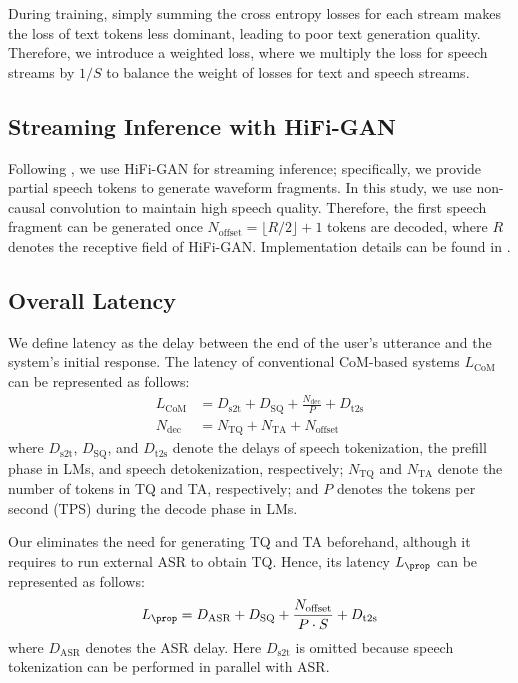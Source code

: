 During training, simply summing the cross entropy losses for each stream makes the loss of text tokens less dominant, leading to poor text generation quality.
Therefore, we introduce a weighted loss, where we multiply the loss for speech streams by $1/S$ to balance the weight of losses for text and speech streams.

\subsection{Streaming Inference with HiFi-GAN}
Following \citet{chen2022streaming}, we use HiFi-GAN for streaming inference; specifically, we provide partial speech tokens to generate waveform fragments.
In this study, we use non-causal convolution to maintain high speech quality.
Therefore, the first speech fragment can be generated once $N_\textrm{offset} = \lfloor R / 2 \rfloor + 1$ tokens are decoded, where $R$ denotes the receptive field of HiFi-GAN.
Implementation details can be found in .

\subsection{Overall Latency}
\label{sec:latency}
We define latency as the delay between the end of the user's utterance and the system's initial response.
The latency of conventional CoM-based systems $L_\textrm{CoM}$ can be represented as follows:
\begin{align}
    L_\textrm{CoM} &= D_\textrm{s2t} + D_\textrm{SQ} + \frac{N_\textrm{dec}}{P} + D_\textrm{t2s} \\
    N_\textrm{dec} &= N_\textrm{TQ} + N_\textrm{TA} + N_\textrm{offset}
    \label{eq:latency_com}
\end{align}
where $D_\textrm{s2t}$, $D_\textrm{SQ}$, and $D_\textrm{t2s}$ denote the delays of speech tokenization, the prefill phase in LMs, and speech detokenization, respectively; $N_\textrm{TQ}$ and $N_\textrm{TA}$ denote the number of tokens in TQ and TA, respectively; and $P$ denotes the tokens per second (TPS) during the decode phase in LMs.

Our \prop eliminates the need for generating TQ and TA beforehand, although it requires to run external ASR to obtain TQ.
Hence, its latency $L_\textrm{\prop}$ can be represented as follows:
\begin{align}
    L_\textrm{\prop} = D_\textrm{ASR} + D_\textrm{SQ} + \frac{N_\textrm{offset}}{P\cdot S} + D_\textrm{t2s}
    \label{eq:latency_pslm}
\end{align}
where $D_\textrm{ASR}$ denotes the ASR delay.
Here $D_\textrm{s2t}$ is omitted because speech tokenization can be performed in parallel with ASR.

